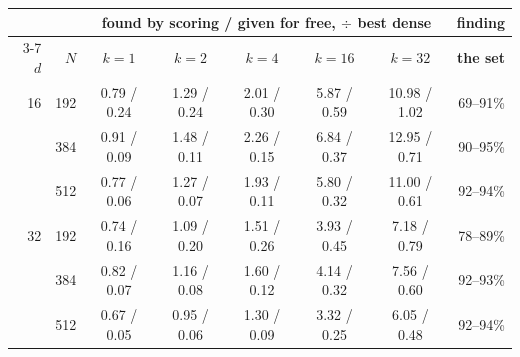 \begin{tabular}{rr ccccc r}
\toprule
& & \multicolumn{5}{c}{\textbf{found by scoring / given for free}, $\div$ best dense} & \textbf{finding} \\
\cmidrule(lr){3-7}
$d$ & $N$ & $k{=}1$ & $k{=}2$ & $k{=}4$ & $k{=}16$ & $k{=}32$ & \textbf{the set} \\
\midrule
16 & 192 & 0.79 / 0.24 & 1.29 / 0.24 & 2.01 / 0.30 & 5.87 / 0.59 & 10.98 / 1.02 & 69--91\% \\
 & 384 & 0.91 / 0.09 & 1.48 / 0.11 & 2.26 / 0.15 & 6.84 / 0.37 & 12.95 / 0.71 & 90--95\% \\
 & 512 & 0.77 / 0.06 & 1.27 / 0.07 & 1.93 / 0.11 & 5.80 / 0.32 & 11.00 / 0.61 & 92--94\% \\
\midrule
32 & 192 & 0.74 / 0.16 & 1.09 / 0.20 & 1.51 / 0.26 & 3.93 / 0.45 & 7.18 / 0.79 & 78--89\% \\
 & 384 & 0.82 / 0.07 & 1.16 / 0.08 & 1.60 / 0.12 & 4.14 / 0.32 & 7.56 / 0.60 & 92--93\% \\
 & 512 & 0.67 / 0.05 & 0.95 / 0.06 & 1.30 / 0.09 & 3.32 / 0.25 & 6.05 / 0.48 & 92--94\% \\
\bottomrule
\end{tabular}%
